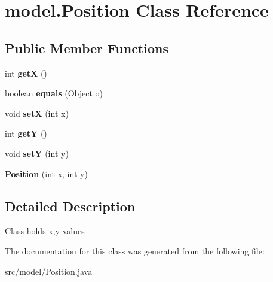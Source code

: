 \hypertarget{classmodel_1_1_position}{\section{model.\-Position Class Reference}
\label{classmodel_1_1_position}
}
\subsection*{Public Member Functions}
\begin{DoxyCompactItemize}
\item 
\hypertarget{classmodel_1_1_position_a6ceb73d09f9d6a6cb720472e6862dab8}{int {\bfseries get\-X} ()}\label{classmodel_1_1_position_a6ceb73d09f9d6a6cb720472e6862dab8}

\item 
\hypertarget{classmodel_1_1_position_aeec8ea9b7aeca88f430a50c9d8f30477}{boolean {\bfseries equals} (Object o)}\label{classmodel_1_1_position_aeec8ea9b7aeca88f430a50c9d8f30477}

\item 
\hypertarget{classmodel_1_1_position_a53b830250bf9ab9225907b1ac1fa2afc}{void {\bfseries set\-X} (int x)}\label{classmodel_1_1_position_a53b830250bf9ab9225907b1ac1fa2afc}

\item 
\hypertarget{classmodel_1_1_position_a381b81ebdc4745990d3f1a5f1eea61d4}{int {\bfseries get\-Y} ()}\label{classmodel_1_1_position_a381b81ebdc4745990d3f1a5f1eea61d4}

\item 
\hypertarget{classmodel_1_1_position_a212fd844c320b7e47e7be3bb70b5e8b2}{void {\bfseries set\-Y} (int y)}\label{classmodel_1_1_position_a212fd844c320b7e47e7be3bb70b5e8b2}

\item 
\hypertarget{classmodel_1_1_position_ad22f68d72b9f99f996c7f0ef2ab6a7d3}{{\bfseries Position} (int x, int y)}\label{classmodel_1_1_position_ad22f68d72b9f99f996c7f0ef2ab6a7d3}

\end{DoxyCompactItemize}


\subsection{Detailed Description}
Class holds x,y values 

The documentation for this class was generated from the following file\-:\begin{DoxyCompactItemize}
\item 
src/model/Position.\-java\end{DoxyCompactItemize}
